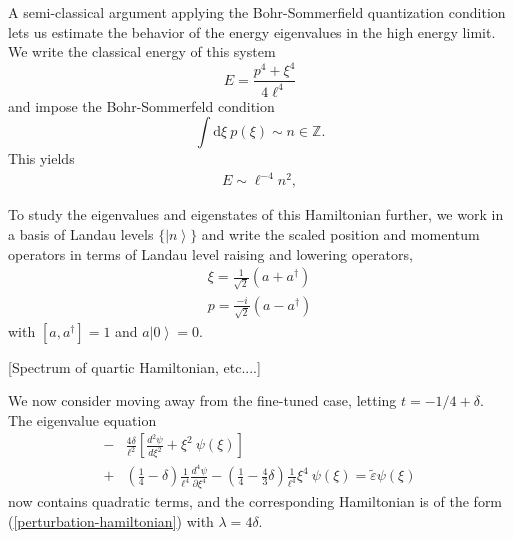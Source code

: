 \documentclass[aps,prb,twocolumn,letterpaper,twoside,nobalancelastpage,groupedaddress,amsmath,amssymb,floatfix,citeautoscript]{revtex4-1}
\begin{document}
A semi-classical argument applying the Bohr-Sommerfield quantization condition lets us estimate the behavior of the energy eigenvalues in the high energy limit. We write the classical energy of this system
\[
E = \frac{p^4+\xi^4}{4\ell^4}
\]
and impose the Bohr-Sommerfeld condition
\[
\int \text{d}\xi~p(\xi) \sim n \in \mathbb{Z}.
\]
This yields
\begin{align*}
E \sim \ell^{-4} n^2,
\end{align*}

To study the eigenvalues and eigenstates of this Hamiltonian further, we work in a basis of Landau levels $\{\left|n\right>\}$ and write the scaled position and momentum operators in terms of Landau level raising and lowering operators,
\begin{align*}
\xi = \frac{1}{\sqrt{2}}\left(a + a^{\dag}\right)\\
p = \frac{-i}{\sqrt{2}}\left(a - a^{\dag}\right)
\end{align*}
with $\left[a,a^{\dag}\right] = 1$ and $a\!\left|0\right> =0$.

[Spectrum of quartic Hamiltonian, etc....]

We now consider moving away from the fine-tuned case, letting $t = -1/4 + \delta$. The eigenvalue equation
\begin{align*}
-&\frac{4\delta}{\ell^2}\left[\frac{d^2 \psi}{d \xi^2} + \xi^2~\psi(\xi)\right]\\ + &\left(\frac{1}{4} - \delta\right)\frac{1}{\ell^4}\frac{d^4 \psi}{\partial \xi^4} -\left(\frac{1}{4} - \frac{4}{3}\delta\right)\frac{1}{\ell^4}\xi^4~\psi(\xi) =  \tilde{\varepsilon}\psi(\xi)
\end{align*}
now contains quadratic terms, and the corresponding Hamiltonian is of the form (\ref{perturbation-hamiltonian}) with $\lambda = 4\delta$. 
\end{document}

